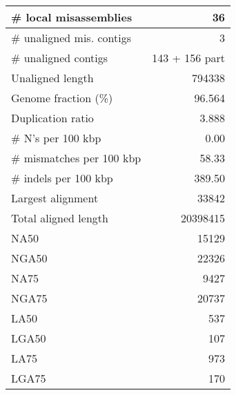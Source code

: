 \documentclass[12pt,a4paper]{article}
\begin{document}
\begin{table}[ht]
\begin{center}
\begin{tabular}{|l*{1}{|r}|}
\# local misassemblies & 36 \\ \hline
\# unaligned mis. contigs & 3 \\ \hline
\# unaligned contigs & 143 + 156 part \\ \hline
Unaligned length & 794338 \\ \hline
Genome fraction (\%) & 96.564 \\ \hline
Duplication ratio & 3.888 \\ \hline
\# N's per 100 kbp & 0.00 \\ \hline
\# mismatches per 100 kbp & 58.33 \\ \hline
\# indels per 100 kbp & 389.50 \\ \hline
Largest alignment & 33842 \\ \hline
Total aligned length & 20398415 \\ \hline
NA50 & 15129 \\ \hline
NGA50 & 22326 \\ \hline
NA75 & 9427 \\ \hline
NGA75 & 20737 \\ \hline
LA50 & 537 \\ \hline
LGA50 & 107 \\ \hline
LA75 & 973 \\ \hline
LGA75 & 170 \\ \hline
\end{tabular}
\end{center}
\end{table}
\end{document}
